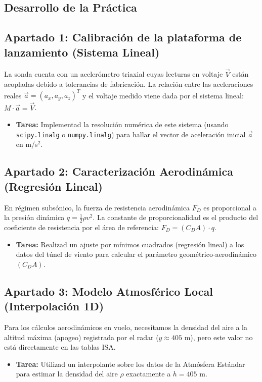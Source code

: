 	\newpage
	\subsection*{Desarrollo de la Práctica}
	
	\subsection*{Apartado 1: Calibración de la plataforma de lanzamiento (Sistema Lineal)}
	La sonda cuenta con un acelerómetro triaxial cuyas lecturas en voltaje $\vec{V}$ están acopladas debido a tolerancias de fabricación. La relación entre las aceleraciones reales $\vec{a} = (a_x, a_y, a_z)^T$ y el voltaje medido viene dada por el sistema lineal: $M \cdot \vec{a} = \vec{V}$.
	\begin{itemize}
		\item \textbf{Tarea:} Implementad la resolución numérica de este sistema (usando \texttt{scipy.linalg} o \texttt{numpy.linalg}) para hallar el vector de aceleración inicial $\vec{a}$ en m/s$^2$. 
	\end{itemize}
	
	\subsection*{Apartado 2: Caracterización Aerodinámica (Regresión Lineal)}
	En régimen subsónico, la fuerza de resistencia aerodinámica $F_D$ es proporcional a la presión dinámica $q = \frac{1}{2}\rho v^2$. La constante de proporcionalidad es el producto del coeficiente de resistencia por el área de referencia: $F_D = (C_D A) \cdot q$.
	\begin{itemize}
		\item \textbf{Tarea:} Realizad un ajuste por mínimos cuadrados (regresión lineal) a los datos del túnel de viento para calcular el parámetro geométrico-aerodinámico $(C_D A)$. 
	\end{itemize}
	
	\subsection*{Apartado 3: Modelo Atmosférico Local (Interpolación 1D)}
	Para los cálculos aerodinámicos en vuelo, necesitamos la densidad del aire a la altitud máxima (apogeo) registrada por el radar ($y \approx 405$ m), pero este valor no está directamente en las tablas ISA.
	\begin{itemize}
		\item \textbf{Tarea:} Utilizad un interpolante
		sobre los datos de la Atmósfera Estándar para estimar la densidad del aire $\rho$ exactamente a $h = 405$ m.
	\end{itemize}
	
